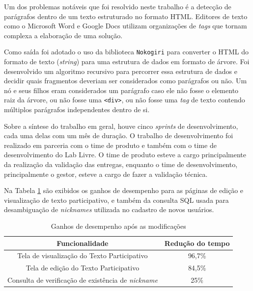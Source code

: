 Um dos problemas notáveis que foi resolvido neste trabalho é a detecção de parágrafos dentro de um texto estruturado no formato HTML. Editores de texto como o Microsoft Word e Google Docs utilizam organizações de \textit{tags} que tornam complexa a elaboração de uma solução.

Como saída foi adotado o uso da biblioteca \texttt{Nokogiri} para converter o HTML do formato de texto (\textit{string}) para uma estrutura de dados em formato de árvore.
Foi desenvolvido um algoritmo recursivo para percorrer essa estrutura de dados e decidir quais fragmentos deveriam ser considerados como parágrafos ou não.
Um nó e seus filhos eram considerados um parágrafo caso ele não fosse o elemento raiz da árvore, ou não fosse uma \texttt{<div>}, ou não fosse uma \textit{tag} de texto contendo múltiplos parágrafos independentes dentro de si.

Sobre a síntese do trabalho em geral, houve cinco \textit{sprints} de desenvolvimento, cada uma delas com um mês de duração.
O trabalho de desenvolvimento foi realizado em parceria com o time de produto e também com o time de desenvolvimento do Lab Livre.
O time de produto esteve a cargo principalmente da realização da validação das entregas, enquanto o time de desenvolvimento, principalmente o gestor, esteve a cargo de fazer a validação técnica.

Na Tabela \ref{tab:ganho-desempenho-apos-modificacoes} são exibidos os ganhos de desempenho para as páginas de edição e visualização de texto participativo, e também da consulta SQL usada para desambiguação de \textit{nicknames} utilizada no cadastro de novos usuários.

\begin{table}[h]
	\centering
	\caption{Ganhos de desempenho após as modificações}
	\label{tab:ganho-desempenho-apos-modificacoes}
	\begin{tabular}{cc}
    \toprule
    \textbf{Funcionalidade} & \textbf{Redução do tempo} \\
    \midrule
    Tela de visualização do Texto Participativo & 96,7\% \\
    Tela de edição do Texto Participativo & 84,5\% \\
    Consulta de verificação de existência de \textit{nickname} & 25\% \\
		\bottomrule
	\end{tabular}
\end{table}
